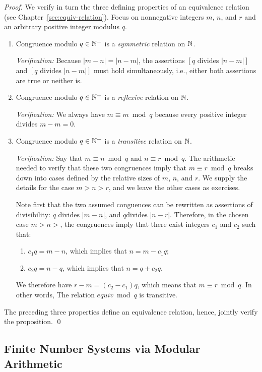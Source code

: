 \begin{proof}
We verify in turn the three defining properties of an equivalence
relation (see Chapter~\ref{sec:equiv-relation}).  Focus on nonnegative
integers $m$, $n$, and $r$ and an arbitrary positive integer modulus
$q$.

\begin{enumerate}
\item
Congruence modulo $q \in \mathbb{N}^+$ is a {\em symmetric} relation on $\mathbb{N}$.

{\it Verification:}
Because $|m-n| = |n-m|$, the assertions $[q \mbox{ divides } |n-m|]$
and $[q \mbox{ divides } |n-m|]$ must hold simultaneously, i.e.,
either both assertions are true or neither is.

\item
Congruence modulo $q \in \mathbb{N}^+$ is a {\em reflexive} relation on $\mathbb{N}$.

{\it Verification:}
We always have $m \equiv m \bmod q$ because every positive integer
divides $m-m = 0$.

\item
Congruence modulo $q \in \mathbb{N}^+$ is a {\em transitive} relation on $\mathbb{N}$.

{\it Verification:}
Say that $m \equiv n \bmod q$ and $n \equiv r \bmod q$.  The
arithmetic needed to verify that these two congruences imply that $m
\equiv r \bmod q$ breaks down into cases defined by the relative sizes
of $m$, $n$, and $r$.  We supply the details for the case $m > n > r$,
and we leave the other cases as exercises.

Note first that the two assumed conguences can be rewritten as
assertions of divisibility: $q \mbox{ divides } |m-n|$, and $q \mbox{
  divides } |n-r|$.  Therefore, in the chosen case $m > n > $, the
congruences imply that there exist integers $c_1$ and $c_2$ such that:
  \begin{enumerate}
  \item
$c_1 q = m-n$, which implies that $n = m - c_1 q$;
  \item
$c_2 q = n-q$, which implies that $n = q + c_2 q$.
  \end{enumerate}
We therefore have $r-m = (c_2-c_1) q$, which means that $m \equiv r
\bmod q$.  In other words, The relation $equiv \bmod q$ is transitive.
\end{enumerate}
The preceding three properties define an equivalence relation, hence,
jointly verify the proposition.
\qed
\end{proof}

\subsection{Finite Number Systems via Modular Arithmetic}
\label{sec:modular}

